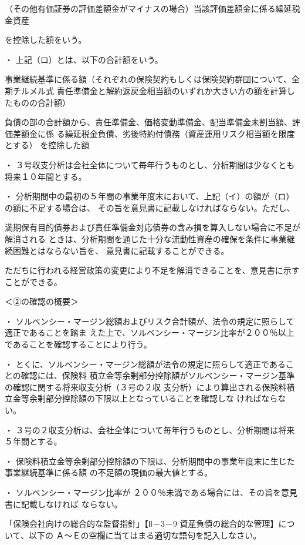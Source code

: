 \documentclass[report,gutter=10mm,fore-edge=10mm,uplatex,dvipdfmx]{jlreq}
\begin{document}
（その他有価証券の評価差額金がマイナスの場合）当該評価差額金に係る繰延税金資産

を控除した額をいう。

・ 上記（ロ）とは、以下の合計額をいう。

事業継続基準に係る額（それぞれの保険契約もしくは保険契約群団について、全期チルメル式
責任準備金と解約返戻金相当額のいずれか大きい方の額を計算したものの合計額）

負債の部の合計額から、責任準備金、価格変動準備金、配当準備金未割当額、評価差額金に係
る繰延税金負債、劣後特約付債務（資産運用リスク相当額を限度とする） を控除した額

・ ３号収支分析は会社全体について毎年行うものとし、分析期間は少なくとも将来１０年間とする。

・ 分析期間中の最初の５年間の事業年度末において、上記（イ）の額が（ロ）の額に不足する場合は、
その旨を意見書に記載しなければならない。ただし、


満期保有目的債券および責任準備金対応債券の含み損を算入しない場合に不足が解消される
ときは、分析期間を通じた十分な流動性資産の確保を条件に事業継続困難とはならない旨を、
意見書に記載することができる。


ただちに行われる経営政策の変更により不足を解消できることを、意見書に示すことができる。

＜②の確認の概要＞

・ ソルベンシー・マージン総額およびリスク合計額が、法令の規定に照らして適正であることを踏ま
えた上で、ソルベンシー・マージン比率が２００％以上であることを確認することにより行う。

・ とくに、ソルベンシー・マージン総額が法令の規定に照らして適正であることの確認には、保険料
積立金等余剰部分控除額がソルベンシー・マージン基準の確認に関する将来収支分析（３号の２収
支分析）により算出される保険料積立金等余剰部分控除額の下限以上となっていることを確認しな
ければならない。

・ ３号の２収支分析は、会社全体について毎年行うものとし、分析期間は将来５年間とする。

・ 保険料積立金等余剰部分控除額の下限は、分析期間中の事業年度末に生じた事業継続基準に係る額
の不足額の現価の最大値とする。

・ ソルベンシー・マージン比率が ２００％未満である場合には、その旨を意見書に記載しなければ
ならない。


「保険会社向けの総合的な監督指針」【Ⅱ－3－9 資産負債の総合的な管理】について、以下の
Ａ～Ｅの空欄に当てはまる適切な語句を記入しなさい。
\end{document}
